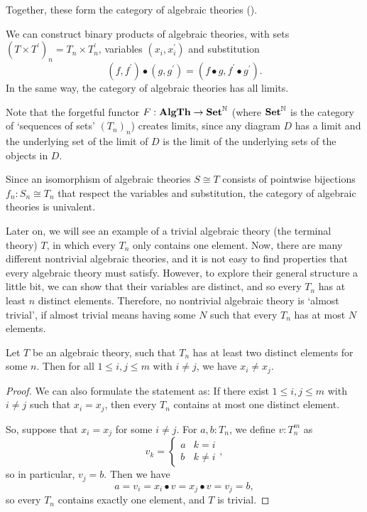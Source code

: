 Together, these form the category of algebraic theories \iindex{$ \AlgTh $} ().

\begin{lemma}\label{rem:algebraic-theory-limits}
  We can construct binary products of algebraic theories, with sets $ (T \times T^\prime)_n = T_n \times T^\prime_n $, variables $ (x_i, x^\prime_i) $ and substitution
  \[ (f, f^\prime) \bullet (g, g^\prime) = (f \bullet g, f^\prime \bullet g^\prime). \]
  In the same way, the category of algebraic theories has all limits.

  Note that the forgetful functor $ F: \mathbf{AlgTh} \to \mathbf{Set}^{\mathbb N} $ (where $ \mathbf{Set}^{\mathbb N} $ is the category of `sequences of sets' $ (T_n)_n $) creates limits, since any diagram $ D $ has a limit and the underlying set of the limit of $ D $ is the limit of the underlying sets of the objects in $ D $.
\end{lemma}

\begin{lemma}
  Since an isomorphism of algebraic theories $ S \cong T $ consists of pointwise bijections $ f_n: S_n \cong T_n $ that respect the variables and substitution, the category of algebraic theories is univalent.
\end{lemma}

Later on, we will see an example of a trivial algebraic theory (the terminal theory) $ T $, in which every $ T_n $ only contains one element. Now, there are many different nontrivial algebraic theories, and it is not easy to find properties that every algebraic theory must satisfy. However, to explore their general structure a little bit, we can show that their variables are distinct, and so every $ T_n $ has at least $ n $ distinct elements. Therefore, no nontrivial algebraic theory is `almost trivial', if almost trivial means having some $ N $ such that every $ T_n $ has at most $ N $ elements.
\begin{lemma}\label{lem:nontrivial-algebraic-theory}
  Let $ T $ be an algebraic theory, such that $ T_n $ has at least two distinct elements for some $ n $. Then for all $ 1 \leq i, j \leq m $ with $ i \not = j $, we have $ x_i \not = x_j $.
\end{lemma}
\begin{proof}
  We can also formulate the statement as: If there exist $ 1 \leq i, j \leq m $ with $ i \not = j $ such that $ x_i = x_j $, then every $ T_n $ contains at most one distinct element.

  So, suppose that $ x_i = x_j $ for some $ i \not = j $. For $ a, b : T_n $, we define $ v : T_n^m $ as
  \[ v_k = \left\{\begin{array}{ll} a & k = i\\ b & k \not = i \end{array}\right., \]
  so in particular, $ v_j = b $. Then we have
  \[ a = v_i = x_i \bullet v = x_j \bullet v = v_j = b, \]
  so every $ T_n $ contains exactly one element, and $ T $ is trivial.
\end{proof}


